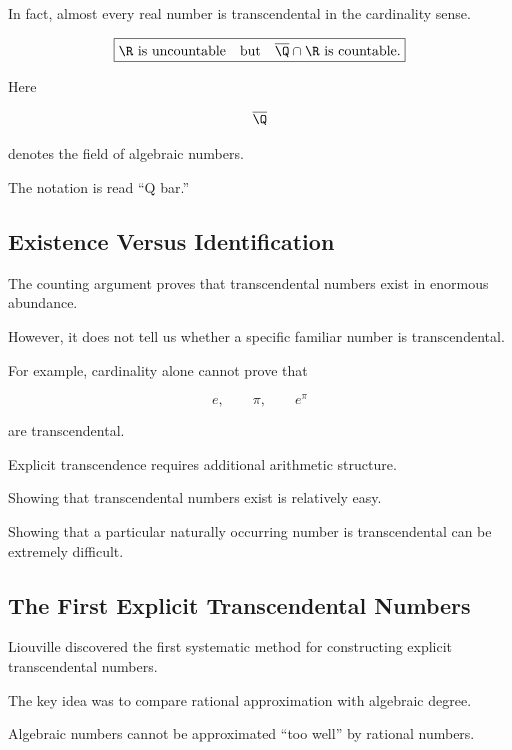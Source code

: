 In fact, almost every real number is transcendental in the cardinality sense.

\[
\boxed{
\R\text{ is uncountable}
\quad\text{but}\quad
\overline{\Q}\cap\R\text{ is countable}.
}
\]

Here

\[ \overline{\Q} \]

denotes the field of algebraic numbers.

The notation is read ``Q bar.''

\subsection{Existence Versus Identification}
\label{subsec:existence-versus-identification-transcendence}

The counting argument proves that transcendental numbers exist in enormous
abundance.

However, it does not tell us whether a specific familiar number is
transcendental.

For example, cardinality alone cannot prove that

\[ e,\qquad\pi,\qquad e^\pi \]

are transcendental.

Explicit transcendence requires additional arithmetic structure.

\begin{conceptbox}
Showing that transcendental numbers exist is relatively easy.

Showing that a particular naturally occurring number is transcendental can
be extremely difficult.
\end{conceptbox}

\subsection{The First Explicit Transcendental Numbers}
\label{subsec:first-explicit-transcendentals}

Liouville discovered the first systematic method for constructing explicit
transcendental numbers.

The key idea was to compare rational approximation with algebraic degree.

Algebraic numbers cannot be approximated ``too well'' by rational numbers.

